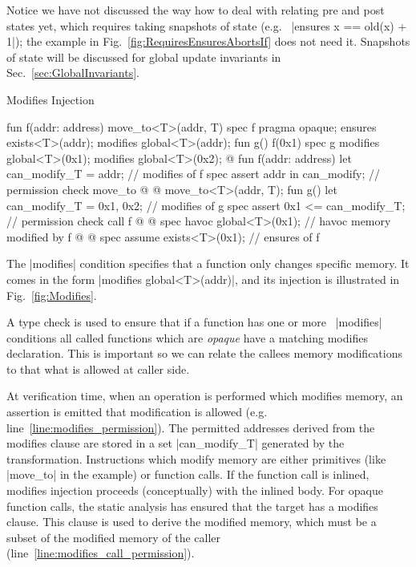 Notice we have not discussed the way how to deal with relating pre and post
states yet, which requires taking snapshots of state (e.g.~%
|ensures x == old(x) + 1|); the example in
Fig.~\ref{fig:RequiresEnsuresAbortsIf} does not need it. Snapshots of state
will be discussed for global update invariants in Sec.~\ref{sec:GlobalInvariants}.


\begin{Figure}
  \caption{Modifies Injection}
  \label{fig:Modifies}
  \centering
\begin{MoveBox}
  fun f(addr: address) { move_to<T>(addr, T{}) }
  spec f {
    pragma opaque;
    ensures exists<T>(addr);
    modifies global<T>(addr);
  }
  fun g() { f(0x1) }
  spec g {
    modifies global<T>(0x1); modifies global<T>(0x2);
  }
  @\transform@
  fun f(addr: address) {
    let can_modify_T = {addr};         // modifies of f
    spec assert addr in can_modify;    // permission check move_to @%
                                            \label{line:modifies_permission}@
    move_to<T>(addr, T{});
  }
  fun g() {
    let can_modify_T = {0x1, 0x2};     // modifies of g
    spec assert {0x1} <= can_modify_T; // permission check call f @%
                                            \label{line:modifies_call_permission}@
    spec havoc global<T>(0x1);         // havoc memory modified by f @%
                                            \label{line:modifies_havoc}@
    spec assume exists<T>(0x1);        // ensures of f
  }
\end{MoveBox}
\end{Figure}


The |modifies| condition specifies that a function only changes specific memory.
It comes in the form |modifies global<T>(addr)|, and its injection is
illustrated in Fig.~\ref{fig:Modifies}.

A type check is used to ensure that if a function has one or more~%
|modifies| conditions all called functions which are \emph{opaque} have a matching
modifies declaration. This is important so we can relate the callees
memory modifications to that what is allowed at caller side.

At verification time, when an operation is performed which modifies memory, an
assertion is emitted that modification is allowed
(e.g. line~\ref{line:modifies_permission}). The permitted addresses derived from
the modifies clause are stored in a set |can_modify_T| generated by the
transformation. Instructions which modify memory are either primitives (like
|move_to| in the example) or function calls. If the function call is inlined,
modifies injection proceeds (conceptually) with the inlined body. For opaque
function calls, the static analysis has ensured that the target has a modifies
clause.  This clause is used to derive the modified memory, which must be a
subset of the modified memory of the caller
(line~\ref{line:modifies_call_permission}).

